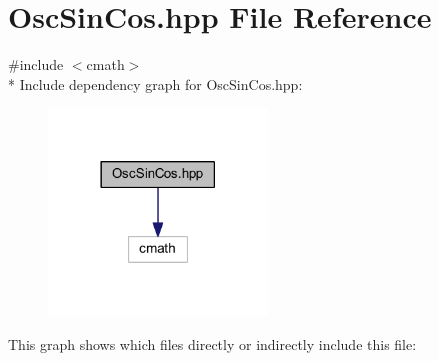 \hypertarget{a00112}{\section{Osc\+Sin\+Cos.\+hpp File Reference}
\label{a00112}
}
{\ttfamily \#include $<$cmath$>$}\\*
Include dependency graph for Osc\+Sin\+Cos.\+hpp\+:
\nopagebreak
\begin{figure}[H]
\begin{center}
\leavevmode
\includegraphics[width=165pt]{de/dab/a00319}
\end{center}
\end{figure}
This graph shows which files directly or indirectly include this file\+:
\nopagebreak
